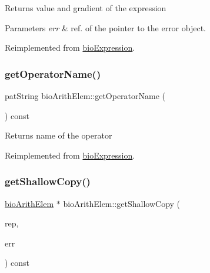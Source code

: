 \begin{DoxyReturn}{Returns}
value and gradient of the expression 
\end{DoxyReturn}

\begin{DoxyParams}{Parameters}
{\em err} & ref. of the pointer to the error object. \\
\hline
\end{DoxyParams}


Reimplemented from \hyperlink{classbio_expression_a91c81ce80c9e972c913b10f5f3c1ed13}{bio\+Expression}.

\mbox{\label{classbio_arith_elem_a501dc3818a694f54765ad69a4a67279e}} 
\subsubsection{\texorpdfstring{get\+Operator\+Name()}{getOperatorName()}}
{\footnotesize\ttfamily pat\+String bio\+Arith\+Elem\+::get\+Operator\+Name (\begin{DoxyParamCaption}{ }\end{DoxyParamCaption}) const\hspace{0.3cm}{\ttfamily [virtual]}}

\begin{DoxyReturn}{Returns}
name of the operator 
\end{DoxyReturn}


Reimplemented from \hyperlink{classbio_expression_a2353a4afb3a2b0af7c63aba086a72bde}{bio\+Expression}.

\mbox{\label{classbio_arith_elem_a481ee9025662995608714643a1239a26}} 
\subsubsection{\texorpdfstring{get\+Shallow\+Copy()}{getShallowCopy()}}
{\footnotesize\ttfamily \hyperlink{classbio_arith_elem}{bio\+Arith\+Elem} $\ast$ bio\+Arith\+Elem\+::get\+Shallow\+Copy (\begin{DoxyParamCaption}\item[{\hyperlink{classbio_expression_repository}{bio\+Expression\+Repository} $\ast$}]{rep,  }\item[{pat\+Error $\ast$\&}]{err }\end{DoxyParamCaption}) const\hspace{0.3cm}{\ttfamily [virtual]}}

